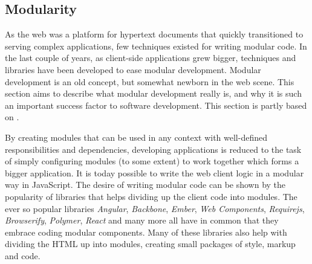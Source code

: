 \documentclass[a4paper,11pt]{kth-mag}
\begin{document}
      \subsection{Modularity}\label{sec:modularity}
        As the web was a platform for \gls{hypertext} \glspl{document} that quickly transitioned to serving complex applications, few techniques existed for writing modular code.
        In the last couple of years, as client-side applications grew bigger, techniques and libraries have been developed to ease modular development.
        Modular development is an old concept, but somewhat newborn in the web scene.
        This section aims to describe what modular development really is, and why it is such an important success factor to software development.
        This section is partly based on .

        By creating modules that can be used in any context with well-defined responsibilities and dependencies, developing applications is reduced to the task of simply configuring modules (to some extent) to work together which forms a bigger application.
        It is today possible to write the \gls{web} client logic in a modular way in \gls{JavaScript}.
        The desire of writing modular code can be shown by the popularity of libraries that helps dividing up the client code into modules.
        The ever so popular libraries \emph{Angular}, \emph{Backbone}, \emph{Ember}, \emph{Web Components}, \emph{Requirejs}, \emph{Browserify}, \emph{Polymer}, \emph{React} and many more all have in common that they embrace coding modular components.
        Many of these libraries also help with dividing the \gls{HTML} up into modules, creating small packages of style, markup and code.
\end{document}
